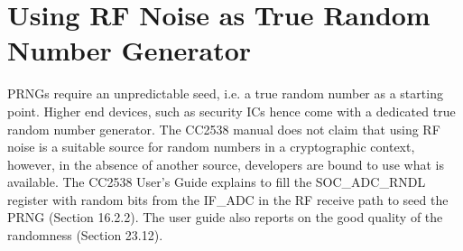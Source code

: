 \section{Using RF Noise as True Random Number Generator} \label{Seed}

PRNGs require an unpredictable seed, i.e. a true random number as a starting point. Higher end devices, such as security ICs hence come with a dedicated true random number generator. The CC2538 manual does not claim that using RF noise is a suitable source for random numbers in a cryptographic context, however, in the absence of another source, developers are bound to use what is available. The CC2538 User's Guide\cite{CC2538Manual} explains to fill the SOC\_ADC\_RNDL register with random bits from the IF\_ADC in the RF receive path to seed the PRNG (Section 16.2.2). The user guide\cite{CC2538Manual} also reports on the good quality of the randomness (Section 23.12). 






